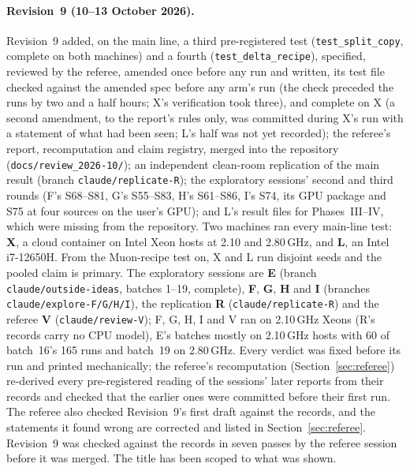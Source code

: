 \documentclass[11pt]{article}
\begin{document}
\paragraph{Revision~9 (10--13 October 2026).}\sloppy Revision~9 added, on the main line, a third pre-registered test (\texttt{test\_split\_copy}, complete on both machines) and a fourth (\texttt{test\_delta\_recipe}), specified, reviewed by the referee, amended once before any run and written, its test file checked against the amended spec before any arm's run (the check preceded the runs by two and a half hours; X's verification took three), and complete on X (a second amendment, to the report's rules only, was committed during X's run with a statement of what had been seen; L's half was not yet recorded); the referee's report, recomputation and claim registry, merged into the repository (\texttt{docs/review\_2026-10/}); an independent clean-room replication of the main result (branch \texttt{claude/replicate-R}); the exploratory sessions' second and third rounds (F's S68--S81, G's S55--S83, H's S61--S86, I's S74, its GPU package and S75 at four sources on the user's GPU); and L's result files for Phases~III--IV, which were missing from the repository. Two machines ran every main-line test: \textbf{X}, a cloud container on Intel Xeon hosts at 2.10 and 2.80\,GHz, and \textbf{L}, an Intel i7-12650H. From the Muon-recipe test on, X and L run disjoint seeds and the pooled claim is primary. The exploratory sessions are \textbf{E} (branch \texttt{claude/outside-ideas}, batches 1--19, complete), \textbf{F}, \textbf{G}, \textbf{H} and \textbf{I} (branches \texttt{claude/explore-F/G/H/I}), the replication \textbf{R} (\texttt{claude/replicate-R}) and the referee \textbf{V} (\texttt{claude/review-V}); F, G, H, I and V ran on 2.10\,GHz Xeons (R's records carry no CPU model), E's batches mostly on 2.10\,GHz hosts with 60 of batch~16's 165 runs and batch~19 on 2.80\,GHz. Every verdict was fixed before its run and printed mechanically; the referee's recomputation (Section~\ref{sec:referee}) re-derived every pre-registered reading of the sessions' later reports from their records and checked that the earlier ones were committed before their first run. The referee also checked Revision~9's first draft against the records, and the statements it found wrong are corrected and listed in Section~\ref{sec:referee}. Revision~9 was checked against the records in seven passes by the referee session before it was merged. The title has been scoped to what was shown.
\end{document}
